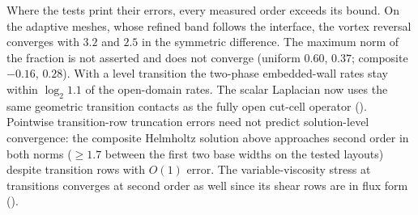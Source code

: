 Where the tests print their errors, every measured order exceeds its bound.
On the adaptive meshes, whose refined band follows the interface, the vortex
reversal converges with $3.2$ and $2.5$ in the symmetric difference. The
maximum norm of the fraction
is not asserted and does not converge (uniform $0.60$, $0.37$; composite
$-0.16$, $0.28$).\label{par:verif:transition-order} With a level transition
the two-phase embedded-wall rates stay within $\log_2 1.1$ of the
open-domain rates. The scalar Laplacian now uses the same geometric
transition contacts as the fully open cut-cell operator ().
Pointwise transition-row truncation errors need not predict solution-level
convergence: the composite Helmholtz solution above approaches second order in
both norms ($\ge1.7$ between the first two base widths on the tested layouts)
despite transition rows with $O(1)$ error.
The variable-viscosity stress at transitions converges at second order as
well since its shear rows are in flux form ().

